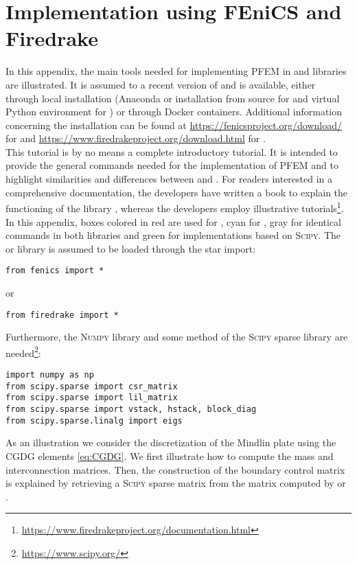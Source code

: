 \chapter{Implementation using FEniCS and Firedrake}

In this appendix, the main tools needed for implementing PFEM  in \fenics and \firedrake libraries are illustrated. It is assumed to a recent version of \fenics and \firedrake is available, either through local installation (Anaconda or installation from source for \fenics and virtual Python environment for \firedrake) or through Docker containers. Additional information concerning the installation can be found at \url{https://fenicsproject.org/download/} for \fenics and \url{https://www.firedrakeproject.org/download.html} for \firedrake. \\

This tutorial is by no means a complete introductory tutorial. It is intended to provide the general commands needed for the implementation of PFEM and to highlight similarities and differences between \fenics and \firedrake. For readers interested in a comprehensive documentation, the \fenics developers have written a book to explain the functioning of the library \cite{logg2012}, whereas the \firedrake developers employ illustrative tutorials\footnote{\url{https://www.firedrakeproject.org/documentation.html}}. \\

In this appendix, boxes colored in red are used for \textcolor{red}{\fenics}, cyan for \textcolor{cyan}{\firedrake}, gray for identical commands in both libraries and green for implementations based on \textsc{Scipy}. The \fenics or \firedrake library is assumed to be loaded through the star import:	
\begin{verbatim}
from fenics import *
\end{verbatim}
or
\begin{verbatim}
from firedrake import *
\end{verbatim}
Furthermore, the \textsc{Numpy} library and some method of the \textsc{Scipy} sparse library  are needed\footnote{\url{https://www.scipy.org/}}:
\begin{Verbatim}
import numpy as np
from scipy.sparse import csr_matrix
from scipy.sparse import lil_matrix
from scipy.sparse import vstack, hstack, block_diag
from scipy.sparse.linalg import eigs
\end{Verbatim}
As an illustration we consider the discretization of the Mindlin plate using the CGDG elements  \eqref{eq:CGDG}. We first illustrate how to compute the mass and interconnection matrices. Then, the construction of the boundary control matrix is explained by retrieving a \textsc{Scipy} sparse matrix from the matrix computed by \fenics or \firedrake.

